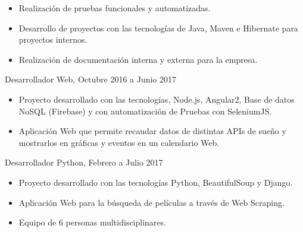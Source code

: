 \documentclass[10pt,a4paper,ragged2e]{altacv}
\begin{document}
\divider

\begin{itemize}
\item Realización de pruebas funcionales y automatizadas. 
\item Desarrollo de proyectos con las tecnologías de Java, Maven e Hibernate para proyectos internos. 
\item Realización de documentación interna y externa para la empresa. 
\end{itemize}


{Desarrollador Web, Octubre 2016 a Junio 2017}{}{}
\begin{itemize}
\item Proyecto desarrollado con las tecnologías, Node.js, Angular2, Base de
datos NoSQL (Firebase) y con automatización de Pruebas con
SeleniumJS.
\item Aplicación Web que permite recaudar datos de distintas APIs de sueño
y mostrarlos en gráficas y eventos en un calendario Web.
\end{itemize}

\divider

{Desarrollador Python, Febrero a Julio 2017}{}{}
\begin{itemize}
\item Proyecto desarrollado con las tecnologías Python, BeautifulSoup y Django.
\item Aplicación Web para la búsqueda de películas a través de Web Scraping.
\item Equipo de 6 personas multidisciplinares.
\end{itemize}
\end{document}

